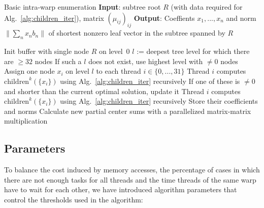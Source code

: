 \documentclass{scrartcl}
\begin{document}
    \begin{algorithm}
        \caption{
            Basic intra-warp enumeration\label{alg:warp_enum}
            \newline
            \textbf{Input}: subtree root $R$ (with data required for Alg.\ \ref{alg:children_iter}), matrix $(\mu_{ij})_{ij}$
            \newline
            \textbf{Output}: Coeffients $x_1, ..., x_n$ and norm $\| \sum_n x_n b_n \|$ of shortest nonzero leaf vector in the subtree spanned by $R$
        }
        \begin{algorithmic}
            \STATE Init buffer with single node $R$ on level~0
                \STATE $l$ := deepest tree level for which there are $\geq 32$ nodes
                \STATE If such a $l$ does not exist, use highest level with $\neq 0$ nodes
                \STATE Assign one node $x_i$ on level $l$ to each thread $i \in \{0, ..., 31\}$
                    \STATE Thread $i$ computes $\mathrm{children}^k(\{x_i\})$ using Alg.\ \ref{alg:children_iter} recursively
                    \STATE If one of these is $\neq 0$ and shorter than the current optimal solution, update it
                \ELSE
                    \STATE Thread $i$ computes $\mathrm{children}^k(\{x_i\})$ using Alg.\ \ref{alg:children_iter} recursively
                    \STATE Store their coefficients and norms
                    \STATE Calculate new partial center sums with a parallelized matrix-matrix multiplication
                \ENDIF
                \ENDWHILE
        \end{algorithmic}
    \end{algorithm}

    \subsection{Parameters}
    
    To balance the cost induced by memory accesses, the percentage of cases in which there are not enough tasks for all threads and the time threads of the same warp have to wait for each other, we have introduced algorithm parameters that control the thresholds used in the algorithm:
    
\end{document}
